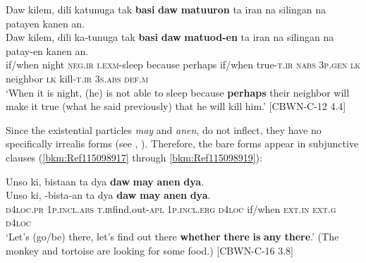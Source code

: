 \ea
\label{bkm:Ref117832478}
Daw  kilem,  dili  katunuga  tak  \textbf{basi}  \textbf{daw} \textbf{matuuron}  ta  iran  na  silingan  na  patayen  kanen  an. \smallskip\\
\gll Daw  kilem,  dili  ka-tunuga  tak  \textbf{basi}  \textbf{daw} \textbf{matuod-en}  ta  iran  na  silingan  na  patay-en  kanen  an. \\
if/when  night  \textsc{neg.ir}  \textsc{i.exm}-sleep  because  perhaps  if/when
true-\textsc{t.ir}  \textsc{nabs}  3\textsc{p.gen}  \textsc{lk}  neighbor  \textsc{lk}  kill-\textsc{t.ir}  3\textsc{s.abs}  \textsc{def.m} \\
\glt `When it is night, (he) is not able to sleep because \textbf{perhaps} their neighbor will make it true (what he said previously) that he will kill him.’ [CBWN-C-12 4.4]
\z

Since the existential particles \textit{may} and \textit{anen}, do not inflect, they have no specifically irrealis forms (see , ). Therefore, the bare forms appear in subjunctive clauses (\ref{bkm:Ref115098917} through \ref{bkm:Ref115098919}):

\ea
\label{bkm:Ref115098917}
Unso  ki,  bistaan  ta  dya  \textbf{daw} \textbf{may}  \textbf{anen}  \textbf{dya}. \smallskip\\
\gll Unso  ki,  \emptyset{}-bista-an  ta  dya  \textbf{daw} \textbf{may}  \textbf{anen}  \textbf{dya}. \\
\textsc{d}4\textsc{loc.pr}  1\textsc{p.incl.abs}  \textsc{t.ir}find.out-\textsc{apl}  1\textsc{p.incl.erg}  \textsc{d}4\textsc{loc}  if/when
\textsc{ext.in}  \textsc{ext.g}  \textsc{d}4\textsc{loc} \\
\glt ‘Let’s (go/be) there, let’s find out there \textbf{whether} \textbf{there} \textbf{is} \textbf{any} \textbf{there}.’ (The monkey and tortoise are looking for some food.) [CBWN-C-16 3.8]
\z

